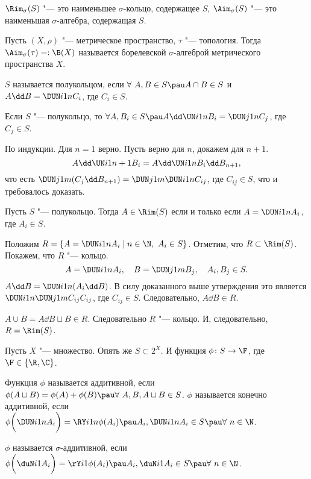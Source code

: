 $\Rim_\sigma(S)$ "--- это наименьшее $\sigma$-кольцо, содержащее $S$, $\Aim_\sigma(S)$ "--- это наименьшая $\sigma$-алгебра, содержащая $S$.
\begin{Def}
  Пусть $(X,\rho)$ "--- метрическое пространство, $\tau$ "--- топология. Тогда $\Aim_\sigma(\tau) =: \B(X)$ называется борелевской $\sigma$-алгеброй метрического пространства $X$.
\end{Def}

\begin{Def}
  $S$ называется полукольцом, если $\forall\ A,B\in S\pau A\cap B\in S$ и $A\dd B = \DUN i1n C_i$, где $C_i\in S$.
\end{Def}

\begin{Ut}
  Если $S$ "--- полукольцо, то $\forall A, B_i\in S\pau A\dd \UN i1n B_i = \DUN j1n C_j$, где $C_j\in S$.
\end{Ut}

\begin{Proof}
  По индукции. Для $n=1$ верно. Пусть верно для $n$, докажем для $n+1$.
\[
  A\dd \UN i1{n+1} B_i = A\dd \UN i1nB_i\dd B_{n+1},
\]
что есть $\DUN j1m (C_j\dd B_{n+1}) = \DUN j1m\DUN i1n C_{ij}$, где $C_{ij}\in S$, что и требовалось доказать.
\end{Proof}

\begin{Lem}
  Пусть $S$ "--- полукольцо. Тогда $A\in \Rim(S)$ если и только если $A = \DUN i1n A_i$, где $A_i\in S$.
\end{Lem}

\begin{Proof}
  Положим $R = \{ A = \DUN i1n A_i\mid n\in\N,\ A_i\in S\}$. Отметим, что $R\subset \Rim(S)$. Покажем, что $R$ "--- кольцо.
\[
  A = \DUN i1n A_i,\quad B=\DUN j1mB_j,\quad A_i,B_j\in S.
\]
$A\dd B = \DUN i1n (A_i\dd B)$. В силу доказанного выше утверждения это является $\DUN i1n\DUN j1mC_{ij} C_{ij}$, где $C_{ij}\in S$. Следовательно, $A\dd B\in R$.

$A\cup B = A\dd B\sqcup B\in R$. Следовательно $R$ "--- кольцо. И, следовательно, $R = \Rim(S)$.
\end{Proof}

Пусть $X$ "--- множество. Опять же $S\subset 2^X$. И функция $\phi\colon S\to \F$, где $\F\in\{\R,\C\}$.
\begin{Def}
 Функция $\phi$ называется аддитивной, если $\phi (A\sqcup B) = \phi(A)+\phi(B)\pau \forall\ A,B,A\sqcup B\in S$. $\phi$ называется конечно аддитивной, если $\phi \bigg(\DUN i1n A_i\bigg)  = \RY i1n\phi(A_i)\pau A_i,\DUN i1n A_i\in S\pau \forall\ n\in \N$.
\end{Def}
\begin{Def}
  $\phi$ называется $\sigma$-аддитивной, если $\phi \bigg(\duN i1 A_i\bigg)  = \rY i1\phi(A_i)\pau A_i,\duN i1 A_i\in S\pau \forall\ n\in \N$.
\end{Def}

